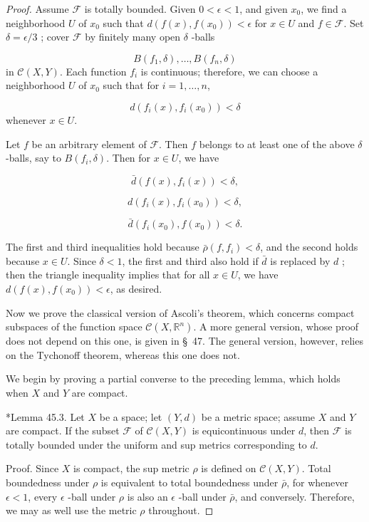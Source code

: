 \begin{proof}
Assume \(\mathcal{F}\) is totally bounded. Given \(0 < \epsilon < 1\), and given \(x_{0}\), we find a neighborhood \(U\) of \(x_{0}\) such that \(d({f(x),f(x_{0}) }) < \epsilon\) for \(x \in U\) and \(f \in \mathcal{F}\).
Set \(\delta = \epsilon /3\) ; cover \(\mathcal{F}\) by finitely many open \(\delta\) -balls

\[
B({f_{1},\delta }),\ldots, B({f_{n},\delta })
\]
in \(\mathcal{C}({X,Y})\). Each function \(f_{i}\) is continuous; therefore, we can choose a neighborhood \(U\) of \(x_{0}\) such that for \(i = 1,\ldots, n\),

\[
d({f_{i}(x),f_{i}(x_{0}) }) < \delta
\]
whenever \(x \in U\).

Let \(f\) be an arbitrary element of \(\mathcal{F}\). Then \(f\) belongs to at least one of the above \(\delta\) -balls, say to \(B({f_{i},\delta })\). Then for \(x \in U\), we have

\[
\bar{d}({f(x),f_{i}(x) }) < \delta ,
\]

\[
d({f_{i}(x),f_{i}(x_{0}) }) < \delta ,
\]

\[
\bar{d}({f_{i}(x_{0}),f(x_{0}) }) < \delta .
\]

The first and third inequalities hold because \(\bar{\rho }({f,f_{i}}) < \delta\), and the second holds because \(x \in U\). Since \(\delta < 1\), the first and third also hold if \(\bar{d}\) is replaced by \(d\) ; then the triangle inequality implies that for all \(x \in U\), we have \(d({f(x),f(x_{0}) }) < \epsilon\), as desired.

Now we prove the classical version of Ascoli's theorem, which concerns compact subspaces of the function space \(\mathcal{C}({X,\mathbb{R}^{n}})\). A more general version, whose proof does not depend on this one, is given in \S\ 47. The general version, however, relies on the Tychonoff theorem, whereas this one does not.

We begin by proving a partial converse to the preceding lemma, which holds when \(X\) and \(Y\) are compact.

*Lemma 45.3. Let \(X\) be a space; let \((Y, d)\) be a metric space; assume \(X\) and \(Y\) are compact. If the subset \(\mathcal{F}\) of \(\mathcal{C}({X,Y})\) is equicontinuous under \(d\), then \(\mathcal{F}\) is totally bounded under the uniform and sup metrics corresponding to \(d\).

Proof. Since \(X\) is compact, the sup metric \(\rho\) is defined on \(\mathcal{C}({X,Y})\). Total boundedness under \(\rho\) is equivalent to total boundedness under \(\bar{\rho }\), for whenever \(\epsilon < 1\), every \(\epsilon\) -ball under \(\rho\) is also an \(\epsilon\) -ball under \(\bar{\rho }\), and conversely. Therefore, we may as well use the metric \(\rho\) throughout.


\end{proof}
